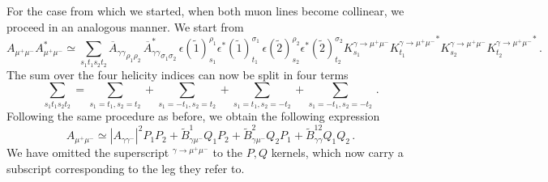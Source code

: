 \documentclass[a4paper,10pt]{article}
\begin{document}
For the case from which we started, when both muon lines become collinear, we proceed in an analogous manner. We start from
\begin{equation}
    A_{\mu^+ \mu^-} A_{\mu^+ \mu^-}^* \simeq 
    \sum_{s_1 t_1 s_2 t_2} {\overline A_{\gamma\gamma} }_{\rho_1 \rho_2}\,  {\overline A^*_{\gamma\gamma} }_{\sigma_1\sigma_2} 
    \, \epsilon(\tilde 1)^{\rho_1}_{s_1}  \epsilon^*(\tilde 1)^{\sigma_1}_{t_1}
    \, \epsilon(\tilde 2)^{\rho_2}_{s_2}  \epsilon^*(\tilde 2)^{\sigma_2}_{t_2}
    K^{\gamma\to\mu^+\mu^-}_{s_1} {K^{\gamma\to\mu^+\mu^-}_{t_1}}^*
    K^{\gamma\to\mu^+\mu^-}_{s_2} {K^{\gamma\to\mu^+\mu^-}_{t_2}}^*\,.
\end{equation}
The sum over the four helicity indices can now be split in four terms
\begin{equation}
 \sum_{s_1 t_1 s_2 t_2} =  \sum_{s_1= t_1, s_2=t_2} + \sum_{s_1=-t_1, s_2=t_2} +\sum_{s_1= t_1, s_2=-t_2} + \sum_{s_1=-t_1, s_2=-t_2}\,.
\end{equation}
Following the same procedure as before, we obtain the following expression
\begin{equation}
  A_{\mu^+ \mu^-} \simeq  |A_{\gamma \gamma^-} |^2 P_1 P_2  +  
                          \tilde B^1_{\gamma \mu^-}  Q_1 P_2 +
                          \tilde B^2_{\gamma \mu^-}  Q_2 P_1 +
                          \tilde B^{12}_{\gamma \gamma}  Q_1 Q_2\, .
\end{equation}
We have omitted the superscript ${ }^{\gamma\to\mu^+\mu^-}$ to the $P,Q$ kernels, which now carry a subscript corresponding to the leg they refer to.
\end{document}
